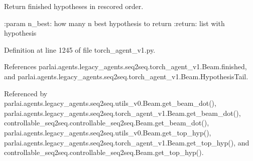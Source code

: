 \begin{DoxyVerb}Return finished hypotheses in rescored order.

:param n_best: how many n best hypothesis to return
:return: list with hypothesis
\end{DoxyVerb}
 

Definition at line 1245 of file torch\+\_\+agent\+\_\+v1.\+py.



References parlai.\+agents.\+legacy\+\_\+agents.\+seq2seq.\+torch\+\_\+agent\+\_\+v1.\+Beam.\+finished, and parlai.\+agents.\+legacy\+\_\+agents.\+seq2seq.\+torch\+\_\+agent\+\_\+v1.\+Beam.\+Hypothesis\+Tail.



Referenced by parlai.\+agents.\+legacy\+\_\+agents.\+seq2seq.\+utils\+\_\+v0.\+Beam.\+get\+\_\+beam\+\_\+dot(), parlai.\+agents.\+legacy\+\_\+agents.\+seq2seq.\+torch\+\_\+agent\+\_\+v1.\+Beam.\+get\+\_\+beam\+\_\+dot(), controllable\+\_\+seq2seq.\+controllable\+\_\+seq2seq.\+Beam.\+get\+\_\+beam\+\_\+dot(), parlai.\+agents.\+legacy\+\_\+agents.\+seq2seq.\+utils\+\_\+v0.\+Beam.\+get\+\_\+top\+\_\+hyp(), parlai.\+agents.\+legacy\+\_\+agents.\+seq2seq.\+torch\+\_\+agent\+\_\+v1.\+Beam.\+get\+\_\+top\+\_\+hyp(), and controllable\+\_\+seq2seq.\+controllable\+\_\+seq2seq.\+Beam.\+get\+\_\+top\+\_\+hyp().

